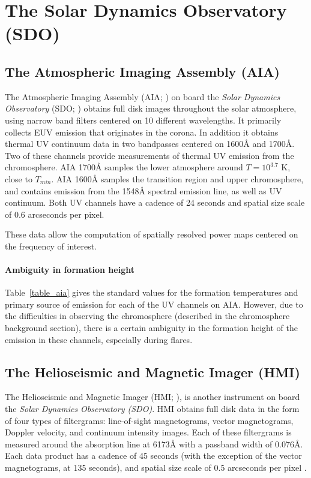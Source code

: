 \clearpage
\section{The Solar Dynamics Observatory (SDO)}

\subsection{The Atmospheric Imaging Assembly (AIA)}

The Atmospheric Imaging Assembly (AIA; \cite{Lemen2012, Boerner2012})
on board the
\textit{Solar Dynamics Observatory} (SDO; \cite{Pesnell2012})
obtains full disk images throughout the solar atmosphere,
using narrow band filters centered on 10 different wavelengths.
It primarily collects EUV emission that originates in the corona.
In addition it obtains thermal UV continuum data in
two bandpasses centered on 1600\AA{} and 1700\AA{}.
Two of these channels provide measurements of
thermal UV emission from the chromosphere.
AIA 1700\AA{} samples the
lower atmosphere around $T = 10^{3.7}$ K, close to $T_{min}$.
AIA 1600\AA{}
samples the transition region and upper chromosphere, and contains emission
from the  1548\AA{} spectral emission line, as well as UV continuum.
Both UV channels have a cadence of
24 seconds and spatial size scale of 0.6 arcseconds per pixel.

These data allow the computation of spatially resolved power maps centered
on the frequency of interest.

\paragraph{Ambiguity in formation height}



Table~\ref{table_aia} gives the standard values for the
formation temperatures and primary source of emission for each
of the UV channels on AIA.
However, due to the difficulties in observing the chromosphere
(described in the chromosphere background section),
there is a certain ambiguity in the formation height of the emission
in these channels, especially during flares.



\subsection{The Helioseismic and Magnetic Imager (HMI)}

The Helioseismic and Magnetic Imager (HMI; \cite{Scherrer2012}),
is another instrument on board
the \textit{Solar Dynamics Observatory (SDO)}.
HMI obtains full disk data in the form of four types of filtergrams:
line-of-sight magnetograms, vector magnetograms,
Doppler velocity, and continuum intensity images.
Each of these filtergrams is
measured around the  absorption line at 6173\AA{}
with a passband width of 0.076\AA{}.
Each data product has a cadence of 45 seconds (with the exception
of the vector magnetograms, at 135 seconds),
and {spatial size scale} of 0.5 arcseconds per pixel
\citep{Schou2012}.

